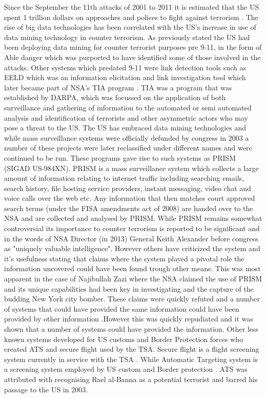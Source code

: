 Since the September the 11th attacks of 2001 to 2011 it is estimated that the US spent 1 trillion dollars on approaches and polices to fight against terrorism \citep{roche2015intelligence}. The rise of big data technologies has been correlated with the US's increase in use of data mining technology in counter terrorism. As previously stated the US had been deploying data mining for counter terrorist  purposes pre 9-11, in the form of Able danger which was purported to have identified some of those involved  in the attacks. Other systems which predated 9-11 were link detection tools such as EELD \citep{mooney2002relational} which was an information  elicitation and link investigation tool which later became part of NSA's TIA program \citep{deibel2016nsa}. TIA was a program that was established by DARPA, which was focussed on the application of both surveillance and gathering of information to the automated  or semi automated analysis and identification of terrorists and other asymmetric actors who may pose a threat to the US. The US has embraced data mining technologies and while mass surveillance systems were officially defunded by congress in 2003 a number of these projects were later reclassified under different names and were continued to be run. These programs gave rise to such systems as PRISM (SIGAD US-984XN). 
PRISM is a mass surveillance system which collects  a large amount of information relating to internet traffic including searching emails, search history, file hosting service providers, instant messaging, video chat and voice calls over the web etc. Any information that then matches court approved search terms (under the FISA amendments act of 2008) are handed over to the NSA and are collected and analysed by PRISM. While PRISM remains somewhat controversial its importance to counter terrorism is reported to be significant and in the words of NSA Director (in 2013) General Keith Alexander before congress  as "uniquely valuable intelligence". However others have criticized the system and it's usefulness stating that claims where the system played a pivotal role the information uncovered could have been found trough other means. This was most apparent in the case of Najibullah Zazi where the NSA claimed the use of PRISM and its unique capabilities had been key in investigating and the capture of the budding New York city bomber. These claims were quickly refuted and  a number of systems that could have provided the same information could  have been provided by other information \citep{NSAAtlanticWire2013}.However this was quickly repudiated  and it was shown that a number of systems could have provided the information. Other less known systems developed for US customs and Border Protection forces who created ATS and secure flight used by the TSA. Secure flight is a flight screening system currently in service with the TSA \citep{spear2015secure}. While Automatic Targeting system is a screening system employed by US custom and Border protection \citep{jizba2015analysis}. ATS was attributed with recognising Rael al-Banna as a potential terrorist and barred his passage to the US in 2003.


